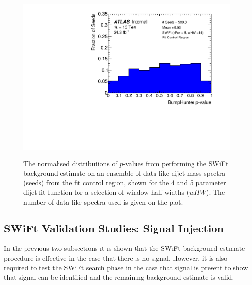 \begin{figure}[!htb]
 {                                                    
  \includegraphics[width=0.48\linewidth, angle=0]{figs/Dibjet/LowMass/FitStudy_min566/pVal_bumpHunter_corrFitCR_5para_low14_high14.pdf}
}                                                                                              
\caption[The normalised distributions of \bh{} \mbox{$p$-value}s from performing the SWiFt background estimate on an ensemble of
          data-like dijet mass spectra from the \lm{} fit control region.]
        {\label{fig:bumpH_spuriousSignal}
          The normalised distributions of \bh{} \mbox{$p$-value}s from performing the SWiFt background estimate on an ensemble of
          data-like dijet mass spectra (seeds) from the \lm{} fit control region,
          shown for the 4 and 5 parameter dijet fit function for a selection of window half-widths ($wHW$). 
          The number of data-like spectra used is given on the plot.
}
\vspace{-1em}
\end{figure}

\subsection{SWiFt Validation Studies: Signal Injection}
\label{sec:bkg-full_signalInj}
\vspace{-0.5em}

In the previous two subsections it is shown that the SWiFt background estimate procedure is effective in the case that there is no signal.
However, it is also required to test the SWiFt search phase in the case that signal is present to show that signal can be identified and the remaining background estimate is valid.

